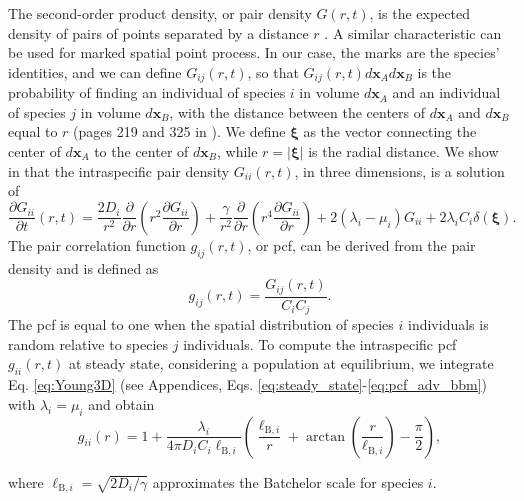 \documentclass[12pt,english]{article}
\newcommand{\ellB}{\ell_{\mathrm{B},i}}
\begin{document}
The second-order product density, or pair density $G(r,t)$, is the
expected density of pairs of points separated by a distance $r$ \citep{law_population_2003}.
A similar characteristic can be used for marked spatial point process.
In our case, the marks are the species' identities, and we can define
$G_{ij}(r,t)$, so that $G_{ij}(r,t)d\mathbf{x}_{A}d\mathbf{x}_{B}$
is the probability of finding an individual of species $i$ in volume
$d\mathbf{x}_{A}$ and an individual of species $j$ in volume $d\mathbf{x}_{B}$,
with the distance between the centers of $d\mathbf{x}_{A}$ and $d\mathbf{x}_{B}$
equal to $r$ (pages 219 and 325 in \citealp{illian2008statistical}).
We define $\boldsymbol{\xi}$ as the vector connecting the center
of $d\mathbf{x}_{A}$ to the center of $d\mathbf{x}_{B}$, while $r=|\boldsymbol{\xi}|$
is the radial distance. We show in \citet{picoche_rescience_2022}
that the intraspecific pair density $G_{ii}(r,t)$, in three dimensions,
is a solution of 
\begin{equation}
\frac{\partial G_{ii}}{\partial t}(r,t)=\frac{2D_{i}}{r^{2}}\frac{\partial}{\partial r}\left(r^{2}\frac{\partial G_{ii}}{\partial r}\right)+\frac{\gamma}{r^{2}}\frac{\partial}{\partial r}\left(r^{4}\frac{\partial G_{ii}}{\partial r}\right)+2(\lambda_{i}-\mu_{i})G_{ii}+2\lambda_{i}C_{i}\delta(\boldsymbol{\xi}).\label{eq:Young3D}
\end{equation}
The pair correlation function $g_{ij}(r,t)$, or pcf, can be derived
from the pair density and is defined as 
\begin{equation}
g_{ij}(r,t)=\frac{G_{ij}(r,t)}{C_{i}C_{j}}.\label{eq:def_pcf}
\end{equation}
The pcf is equal to one when the spatial distribution of species $i$
individuals is random relative to species $j$ individuals. To compute
the intraspecific pcf $g_{ii}(r,t)$ at steady state, considering
a population at equilibrium, we integrate Eq. \ref{eq:Young3D} (see
Appendices, Eqs. \ref{eq:steady_state}-\ref{eq:pcf_adv_bbm}) with
$\lambda_{i}=\mu_{i}$ and obtain 
\begin{equation}
g_{ii}(r)=1+\frac{\lambda_{i}}{4\pi D_{i}C_{i}\ellB}\left(\frac{\ellB}{r}+\arctan\left(\frac{r}{\ellB}\right)-\frac{\pi}{2}\right),\label{eq:pcf_intra_adv}
\end{equation}

where $\ellB=\sqrt{2D_{i}/\gamma}$ approximates the Batchelor scale
for species $i$.
\end{document}
